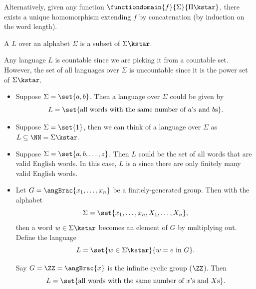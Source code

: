 \begin{remark}
    Alternatively, given any function \(\functiondomain{f}{\Sigma}{\Pi\kstar}\), there exists a unique homomorphism extending \(f\) by concatenation (by induction on the word length).
\end{remark}

\begin{definition}[Language]
    A  \(L\) over an alphabet \(\Sigma\) is a subset of \(\Sigma\kstar\).
\end{definition}

\begin{remark}
    Any language \(L\) is countable since we are picking it from a countable set. However, the set of all languages over \(\Sigma\) is uncountable since it is the power set of \(\Sigma\kstar\).
\end{remark}

\begin{examples*}
    \begin{itemize}
        \item Suppose \(\Sigma = \set{a, b}\). Then a language over \(\Sigma\) could be given by
        \[
            L = \set{\text{all words with the same number of \(a\)'s and \(b\)s}}.
        \]
        \item Suppose \(\Sigma = \set{1}\), then we can think of a language over \(\Sigma\) as \(L \subseteq \NN = \Sigma\kstar\).
        \item Suppose \(\Sigma = \set{a, b, \ldots, z}\). Then \(L\) could be the set of all words that are valid English words. In this case, \(L\) is a  since there are only finitely many valid English words.
        \item Let \(G = \angBrac{x_1, \ldots, x_n}\) be a finitely-generated group. Then with the alphabet
        \[
            \Sigma = \set{x_1, \ldots, x_n, X_1, \ldots, X_n},
        \]
        then a word \(w \in \Sigma\kstar\) becomes an element of \(G\) by multiplying out. Define the language
        \[
            L = \set{w \in \Sigma\kstar}{w = e \text{ in } G}.
        \]

        Say \(G = \ZZ = \angBrac{x}\) is the infinite cyclic group (\(\ZZ\)). Then
        \[
            L = \set{\text{all words with the same number of \(x\)'s and \(X\)s}}.
        \]
    \end{itemize}
\end{examples*}